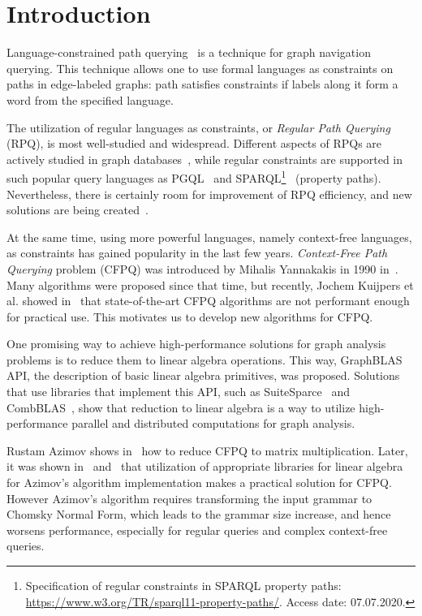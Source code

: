 \section{Introduction}


Language-constrained path querying~\cite{barrett2000formal} is a technique for graph navigation querying.
This technique allows one to use formal languages as constraints on paths in edge-labeled graphs: path satisfies constraints if labels along it form a word from the specified language.

The utilization of regular languages as constraints, or \textit{Regular Path Querying} (RPQ), is most well-studied and widespread.
Different aspects of RPQs are actively studied in graph databases~\cite{10.1145/2463664.2465216, 10.1145/3104031,10.1145/2850413}, while regular constraints are supported in such popular query languages as PGQL~\cite{10.1145/2960414.2960421} and SPARQL\footnote{Specification of regular constraints in SPARQL property paths: \url{https://www.w3.org/TR/sparql11-property-paths/}. Access date: 07.07.2020.}~\cite{10.1007/978-3-319-25007-6_1} (property paths).
Nevertheless, there is certainly room for improvement of RPQ efficiency, and new solutions are being created~\cite{Wang2019,10.1145/2949689.2949711}.

At the same time, using more powerful languages, namely context-free languages, as constraints has gained popularity in the last few years.
\textit{Context-Free Path Querying} problem (CFPQ) was introduced by Mihalis Yannakakis in 1990 in~\cite{Yannakakis}.
Many algorithms were proposed since that time, but recently, Jochem Kuijpers et al. showed in~\cite{Kuijpers:2019:ESC:3335783.3335791} that state-of-the-art CFPQ algorithms are not performant enough for practical use.
This motivates us to develop new algorithms for CFPQ.

One promising way to achieve high-performance solutions for graph analysis problems is to reduce them to linear algebra operations.
This way, GraphBLAS~\cite{7761646} API, the description of basic linear algebra primitives, was proposed.
Solutions that use libraries that implement this API, such as SuiteSparce~\cite{10.1145/3322125} and CombBLAS~\cite{10.1177/1094342011403516}, show that reduction to linear algebra is a way to utilize high-performance parallel and distributed computations for graph analysis.

Rustam Azimov shows in~\cite{Azimov:2018:CPQ:3210259.3210264} how to reduce CFPQ to matrix multiplication.
Later, it was shown in~\cite{Mishin:2019:ECP:3327964.3328503} and~\cite{10.1145/3398682.3399163} that utilization of appropriate libraries for linear algebra for Azimov's algorithm implementation makes a practical solution for CFPQ.
However Azimov's algorithm requires transforming the input grammar to Chomsky Normal Form, which leads to the grammar size increase, and hence worsens performance, especially for regular queries and complex context-free queries.

